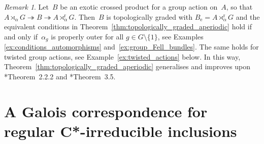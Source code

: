 \documentclass[a4paper]{amsart}
\theoremstyle{plain}
\newtheorem{corollary}[theorem]{Corollary}
\theoremstyle{definition}
\theoremstyle{remark}
\newtheorem{remark}[theorem]{Remark}
\numberwithin{theorem}{section}
\numberwithin{equation}{section}
\newcommand*{\nb}{\nobreakdash}
\newcommand*{\Star}{\(^*\)\nobreakdash-}
\newcommand*{\red}{\mathrm{r}}%
\newcommand*{\ess}{\mathrm{e}}%
\newcommand*{\Cst}{\textup C^*}%
\newcommand*{\B}{\mathcal B}%
\newcommand*{\onto}{\twoheadrightarrow}
\begin{document}
\begin{remark}
  Let~\(B\) be an exotic crossed product for a group action on~\(A\),
  so that  \(A\rtimes_\alpha G\onto B\onto A\rtimes_\alpha^\red G\).
  Then~\(B\) is topologically graded with
  \(B_\ess=A\rtimes_\alpha^\red G\) and the equivalent conditions in
  Theorem~\ref{thm:topologically_graded_aperiodic} hold if and only
  if~\(\alpha_g\) is properly outer for all \(g\in G\setminus\{1\}\),
  see Examples \ref{ex:conditions_automorphisms}
  and~\ref{ex:group_Fell_bundles}.
  The same holds for twisted group actions, see
  Example~\ref{ex:twisted_actions} below.
  In this way, Theorem~\ref{thm:topologically_graded_aperiodic}
  generalises and improves upon
  \cite{Zarikian:Unique_expectations}*{Theorem~2.2.2} and
  \cite{Zarikian:Unique_pseudo}*{Theorem~3.5}.
\end{remark}



\section{A Galois correspondence for regular C*-irreducible
  inclusions}
\label{sec:regular C*-irreducible inclusions}
\end{document}
